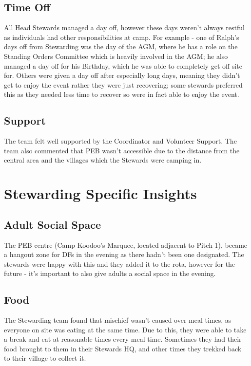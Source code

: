 \subsection{Time Off}
All Head Stewards managed a day off, however these days weren't always restful as individuals had other responsibilities at camp. For example - one of Ralph's days off from Stewarding was the day of the AGM, where he has a role on the Standing Orders Committee which is heavily involved in the AGM; he also managed a day off for his Birthday, which he was able to completely get off site for. Others were given a day off after especially long days, meaning they didn't get to enjoy the event rather they were just recovering; some stewards preferred this as they needed less time to recover so were in fact able to enjoy the event. 

\subsection{Support}
The team felt well supported by the Coordinator and Volunteer Support. The team also commented that PEB wasn't accessible due to the distance from the central area and the villages which the Stewards were camping in. 

\section{Stewarding Specific Insights}
\subsection{Adult Social Space}
The PEB centre (Camp Koodoo's Marquee, located adjacent to Pitch 1), became a hangout zone for DFs in the evening as there hadn't been one designated. The stewards were happy with this and they added it to the rota, however for the future - it's important to also give adults a social space in the evening.

\subsection{Food}
The Stewarding team found that mischief wasn't caused over meal times, as everyone on site was eating at the same time. Due to this, they were able to take a break and eat at reasonable times every meal time. Sometimes they had their food brought to them in their Stewards HQ, and other times they trekked back to their village to collect it. \\

